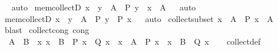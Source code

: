 \begin{isabellebody}
\isadelimproof
\ %
\endisadelimproof
%
\isatagproof
{}\isamarkupfalse%
\ auto%
\endisatagproof
{\isafoldproof}%
%
\isadelimproof
%
\endisadelimproof
\isanewline
\isanewline
{}\isamarkupfalse%
\ mem{\isacharunderscore}{\kern0pt}collectD{\isacharcolon}{\kern0pt}\ {\isachardoublequoteopen}x\ {\isasymin}\ {\isacharbraceleft}{\kern0pt}y\ {\isasymin}\ A\ {\isacharbar}{\kern0pt}\ P\ y{\isacharbraceright}{\kern0pt}\ {\isasymLongrightarrow}\ x\ {\isasymin}\ A{\isachardoublequoteclose}%
\isadelimproof
\ %
\endisadelimproof
%
\isatagproof
{}\isamarkupfalse%
\ auto%
\endisatagproof
{\isafoldproof}%
%
\isadelimproof
%
\endisadelimproof
\isanewline
\isanewline
{}\isamarkupfalse%
\ mem{\isacharunderscore}{\kern0pt}collectD{\isacharprime}{\kern0pt}{\isacharcolon}{\kern0pt}\ {\isachardoublequoteopen}x\ {\isasymin}\ {\isacharbraceleft}{\kern0pt}y\ {\isasymin}\ A\ {\isacharbar}{\kern0pt}\ P\ y{\isacharbraceright}{\kern0pt}\ {\isasymLongrightarrow}\ P\ x{\isachardoublequoteclose}%
\isadelimproof
\ %
\endisadelimproof
%
\isatagproof
{}\isamarkupfalse%
\ auto%
\endisatagproof
{\isafoldproof}%
%
\isadelimproof
%
\endisadelimproof
\isanewline
\isanewline
{}\isamarkupfalse%
\ collect{\isacharunderscore}{\kern0pt}subset{\isacharcolon}{\kern0pt}\ {\isachardoublequoteopen}{\isacharbraceleft}{\kern0pt}x\ {\isasymin}\ A\ {\isacharbar}{\kern0pt}\ P\ x{\isacharbraceright}{\kern0pt}\ {\isasymsubseteq}\ A{\isachardoublequoteclose}%
\isadelimproof
\ %
\endisadelimproof
%
\isatagproof
{}\isamarkupfalse%
\ blast%
\endisatagproof
{\isafoldproof}%
%
\isadelimproof
%
\endisadelimproof
\isanewline
\isanewline
{}\isamarkupfalse%
\ collect{\isacharunderscore}{\kern0pt}cong\ {\isacharbrackleft}{\kern0pt}cong{\isacharbrackright}{\kern0pt}{\isacharcolon}{\kern0pt}\isanewline
\ \ {\isachardoublequoteopen}A\ {\isacharequal}{\kern0pt}\ B\ {\isasymLongrightarrow}\ {\isacharparenleft}{\kern0pt}{\isasymAnd}x{\isachardot}{\kern0pt}\ x\ {\isasymin}\ B\ {\isasymLongrightarrow}\ P\ x\ {\isacharequal}{\kern0pt}\ Q\ x{\isacharparenright}{\kern0pt}\ {\isasymLongrightarrow}\ {\isacharbraceleft}{\kern0pt}x\ {\isasymin}\ A\ {\isacharbar}{\kern0pt}\ P\ x{\isacharbraceright}{\kern0pt}\ {\isacharequal}{\kern0pt}\ {\isacharbraceleft}{\kern0pt}x\ {\isasymin}\ B\ {\isacharbar}{\kern0pt}\ Q\ x{\isacharbraceright}{\kern0pt}{\isachardoublequoteclose}\isanewline
%
\isadelimproof
\ \ %
\endisadelimproof
%
\isatagproof
{}\isamarkupfalse%
\ collect{\isacharunderscore}{\kern0pt}def\ \isamarkupfalse%

\end{isabellebody}
